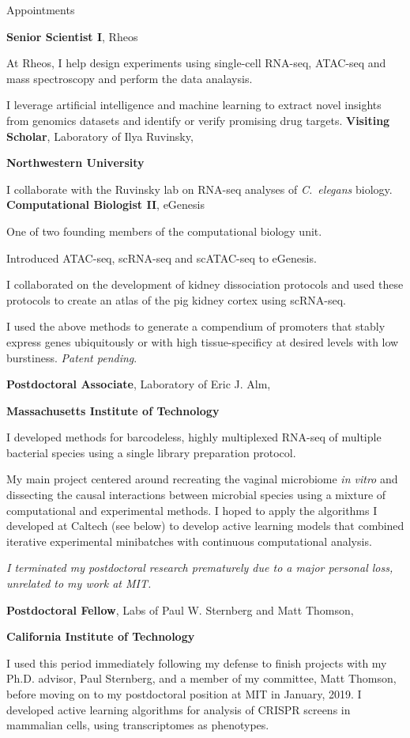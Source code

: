 \begin{rubric}{Appointments}

	\textbf{Senior Scientist I}, Rheos\par
	At Rheos, I help design experiments using single-cell RNA-seq, ATAC-seq and
	mass spectroscopy and perform the data analaysis.\par
	I leverage artificial intelligence and machine learning to extract novel
	insights from genomics datasets and identify or verify promising drug targets.
	\textbf{Visiting Scholar}, Laboratory of Ilya Ruvinsky,\par
	\textbf{Northwestern University}\par
	I collaborate with the Ruvinsky lab on RNA-seq analyses of \textit{C.~elegans}
	biology.
\entry*[11/2019 - 3/2021]
	\textbf{Computational Biologist II}, eGenesis\par
	One of two founding members of the computational biology unit.\par
	Introduced ATAC-seq, scRNA-seq and scATAC-seq to eGenesis.\par
	I collaborated on the development of kidney dissociation protocols and used
	these protocols to create an atlas of the pig kidney cortex using scRNA-seq.\par
	I used the above methods to generate a compendium of promoters that stably
	express genes ubiquitously or with high tissue-specificy at desired levels with
	low burstiness. \textit{Patent pending}.

\entry*[01/2019--11/2019]
		\textbf{Postdoctoral Associate}, Laboratory of Eric J. Alm,\par
		\textbf{Massachusetts Institute of Technology}\par
		I developed methods for barcodeless, highly multiplexed RNA-seq of multiple
		bacterial species using a single library preparation protocol. \par
		My main project centered around recreating the vaginal microbiome \textit{in
		vitro} and dissecting the causal interactions between microbial species
		using a mixture of computational and experimental methods. I hoped to apply
		the algorithms I developed at Caltech (see below) to develop active learning
		models that combined iterative experimental minibatches with continuous
		computational analysis.\par
		\textit{I terminated my postdoctoral research prematurely due to a major
		personal loss, unrelated to my work at MIT.}

\entry*[11/2018--01/2019]
		\textbf{Postdoctoral Fellow}, Labs of Paul W. Sternberg and Matt Thomson,\par
		\textbf{California Institute of Technology}\par
		I used this period immediately following my defense to finish
		projects with my Ph.D. advisor, Paul Sternberg, and a member of my
		committee, Matt Thomson, before moving on to my postdoctoral position
		at MIT in January, 2019. I developed active learning algorithms for analysis
		of CRISPR screens in mammalian cells, using transcriptomes as phenotypes.

\end{rubric}
